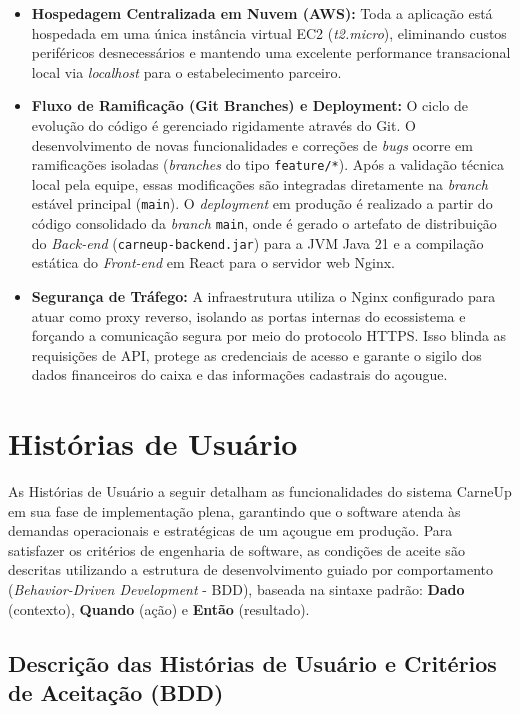 \documentclass[
	12pt,				%
	openany,			%
	oneside,			%
	a4paper,			%
	english,			%
	french,				%
	spanish,			%
	brazil				%
	]{abntex2}
\begin{document}
\begin{itemize}
    \item \textbf{Hospedagem Centralizada em Nuvem (AWS):} Toda a aplicação está hospedada em uma única instância virtual EC2 (\textit{t2.micro}), eliminando custos periféricos desnecessários e mantendo uma excelente performance transacional local via \textit{localhost} para o estabelecimento parceiro.
     
    \item \textbf{Fluxo de Ramificação (Git Branches) e Deployment:} O ciclo de evolução do código é gerenciado rigidamente através do Git. O desenvolvimento de novas funcionalidades e correções de \textit{bugs} ocorre em ramificações isoladas (\textit{branches} do tipo \texttt{feature/*}). Após a validação técnica local pela equipe, essas modificações são integradas diretamente na \textit{branch} estável principal (\texttt{main}). O \textit{deployment} em produção é realizado a partir do código consolidado da \textit{branch} \texttt{main}, onde é gerado o artefato de distribuição do \textit{Back-end} (\texttt{carneup-backend.jar}) para a JVM Java 21 e a compilação estática do \textit{Front-end} em React para o servidor web Nginx.
     
    \item \textbf{Segurança de Tráfego:} A infraestrutura utiliza o Nginx configurado para atuar como proxy reverso, isolando as portas internas do ecossistema e forçando a comunicação segura por meio do protocolo HTTPS. Isso blinda as requisições de API, protege as credenciais de acesso e garante o sigilo dos dados financeiros do caixa e das informações cadastrais do açougue.
\end{itemize}
\section{Histórias de Usuário}

As Histórias de Usuário a seguir detalham as funcionalidades do sistema CarneUp em sua fase de implementação plena, garantindo que o software atenda às demandas operacionais e estratégicas de um açougue em produção. Para satisfazer os critérios de engenharia de software, as condições de aceite são descritas utilizando a estrutura de desenvolvimento guiado por comportamento (\textit{Behavior-Driven Development} - BDD), baseada na sintaxe padrão: \textbf{Dado} (contexto), \textbf{Quando} (ação) e \textbf{Então} (resultado).

\subsection{Descrição das Histórias de Usuário e Critérios de Aceitação (BDD)}
\end{document}
